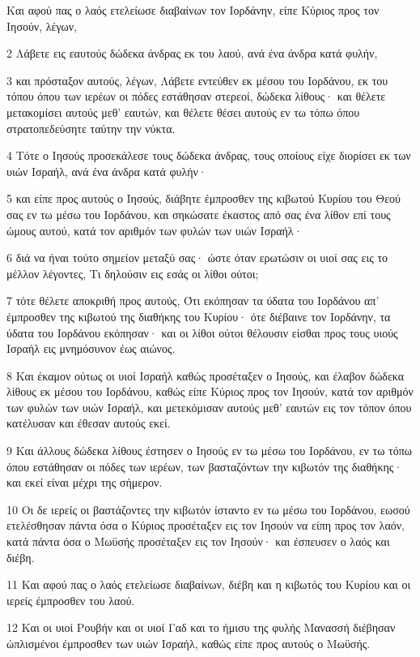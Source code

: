 \par Και αφού πας ο λαός ετελείωσε διαβαίνων τον Ιορδάνην, είπε Κύριος προς τον Ιησούν, λέγων,
\par 2 Λάβετε εις εαυτούς δώδεκα άνδρας εκ του λαού, ανά ένα άνδρα κατά φυλήν,
\par 3 και πρόσταξον αυτούς, λέγων, Λάβετε εντεύθεν εκ μέσου του Ιορδάνου, εκ του τόπου όπου των ιερέων οι πόδες εστάθησαν στερεοί, δώδεκα λίθους· και θέλετε μετακομίσει αυτούς μεθ' εαυτών, και θέλετε θέσει αυτούς εν τω τόπω όπου στρατοπεδεύσητε ταύτην την νύκτα.
\par 4 Τότε ο Ιησούς προσεκάλεσε τους δώδεκα άνδρας, τους οποίους είχε διορίσει εκ των υιών Ισραήλ, ανά ένα άνδρα κατά φυλήν·
\par 5 και είπε προς αυτούς ο Ιησούς, διάβητε έμπροσθεν της κιβωτού Κυρίου του Θεού σας εν τω μέσω του Ιορδάνου, και σηκώσατε έκαστος από σας ένα λίθον επί τους ώμους αυτού, κατά τον αριθμόν των φυλών των υιών Ισραήλ·
\par 6 διά να ήναι τούτο σημείον μεταξύ σας· ώστε όταν ερωτώσιν οι υιοί σας εις το μέλλον λέγοντες, Τι δηλούσιν εις εσάς οι λίθοι ούτοι;
\par 7 τότε θέλετε αποκριθή προς αυτούς, Ότι εκόπησαν τα ύδατα του Ιορδάνου απ' έμπροσθεν της κιβωτού της διαθήκης του Κυρίου· ότε διέβαινε τον Ιορδάνην, τα ύδατα του Ιορδάνου εκόπησαν· και οι λίθοι ούτοι θέλουσιν είσθαι προς τους υιούς Ισραήλ εις μνημόσυνον έως αιώνος.
\par 8 Και έκαμον ούτως οι υιοί Ισραήλ καθώς προσέταξεν ο Ιησούς, και έλαβον δώδεκα λίθους εκ μέσου του Ιορδάνου, καθώς είπε Κύριος προς τον Ιησούν, κατά τον αριθμόν των φυλών των υιών Ισραήλ, και μετεκόμισαν αυτούς μεθ' εαυτών εις τον τόπον όπου κατέλυσαν και έθεσαν αυτούς εκεί.
\par 9 Και άλλους δώδεκα λίθους έστησεν ο Ιησούς εν τω μέσω του Ιορδάνου, εν τω τόπω όπου εστάθησαν οι πόδες των ιερέων, των βασταζόντων την κιβωτόν της διαθήκης· και εκεί είναι μέχρι της σήμερον.
\par 10 Οι δε ιερείς οι βαστάζοντες την κιβωτόν ίσταντο εν τω μέσω του Ιορδάνου, εωσού ετελέσθησαν πάντα όσα ο Κύριος προσέταξεν εις τον Ιησούν να είπη προς τον λαόν, κατά πάντα όσα ο Μωϋσής προσέταξεν εις τον Ιησούν· και έσπευσεν ο λαός και διέβη.
\par 11 Και αφού πας ο λαός ετελείωσε διαβαίνων, διέβη και η κιβωτός του Κυρίου και οι ιερείς έμπροσθεν του λαού.
\par 12 Και οι υιοί Ρουβήν και οι υιοί Γαδ και το ήμισυ της φυλής Μανασσή διέβησαν ώπλισμένοι έμπροσθεν των υιών Ισραήλ, καθώς είπε προς αυτούς ο Μωϋσής.
